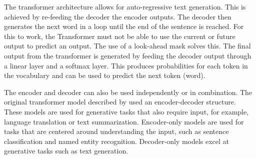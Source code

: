 The transformer architecture allows for auto-regressive text generation. This is achieved by re-feeding the decoder the encoder outputs. The decoder then generates the next word in a loop until the end of the sentence is reached. For this to work, the  Transformer must not be able to use the current or future output to predict an output. The use of a look-ahead mask solves this. The final output from the transformer is generated by feeding the decoder output through a linear layer and a softmax layer. This produces probabilities for each token in the vocabulary and can be used to predict the next token (word).

The encoder and decoder can also be used independently or in combination. The original transformer model described by \textcite{vaswani2017attention} used an encoder-decoder structure. These models are used for generative tasks that also require input, for example, language translation or text summarization. Encoder-only models are used for tasks that are centered around understanding the input, such as sentence classification and named entity recognition. Decoder-only models excel at generative tasks such as text generation.

